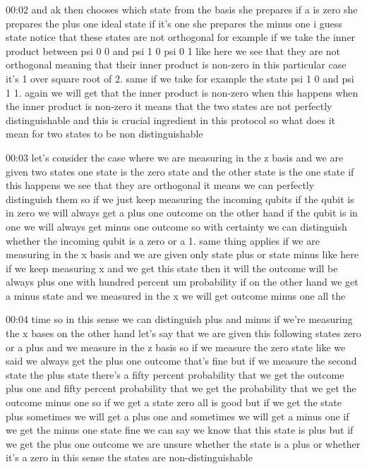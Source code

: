 00:02
and ak then chooses which state from the basis she prepares if a is zero
she prepares the plus one ideal state if it's one she prepares the minus one i
guess state notice that these states are not orthogonal
for example if we take the inner product between psi 0 0 and psi 1 0 psi 0 1
like here we see that they are not orthogonal meaning that their inner
product is non-zero in this particular case it's 1 over square root of 2.
same if we take for example the state psi 1 0 and psi 1 1.
again we will get that the inner product is non-zero
when this happens when the inner product
is non-zero it means that the two states are not perfectly distinguishable
and this is crucial ingredient in this protocol
so what does it mean for two states to be non distinguishable

00:03
let's consider the case where we are measuring in the z basis
and we are given two states one state is the zero state
and the other state is the one state if this happens
we see that they are orthogonal it means we can perfectly distinguish them
so if we just keep measuring the incoming qubits
if the qubit is in zero we will always get a plus one outcome
on the other hand if the qubit is in one we will
always get minus one outcome so with certainty we can distinguish whether the
incoming qubit is a zero or a 1. same thing applies
if we are measuring in the x basis and we are given only state plus
or state minus like here if we keep measuring
x and we get this state then it will the outcome will be always
plus one with hundred percent um probability if on the other hand we get a minus
state and we measured in the x we will get outcome minus one all the

00:04
time so in this sense we can distinguish plus and minus
if we're measuring the x bases on the other hand let's say that we are
given this following states zero or a plus and we measure in the z basis
so if we measure the zero state like we said we always get the plus one outcome
that's fine but if we measure the second state the plus state
there's a fifty percent probability that we get the outcome plus one
and fifty percent probability that we get the probability
that we get the outcome minus one so if we get a state zero all is good but
if we get the state plus sometimes we will get a plus one and
sometimes we will get a minus one if we get the minus one state fine we
can say we know that this state is plus but if we get the plus one outcome we
are unsure whether the state is a plus or whether it's a zero
in this sense the states are non-distinguishable

